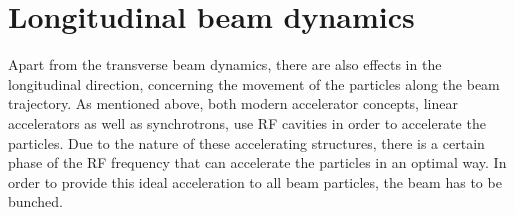 \section{Longitudinal beam dynamics}
\label{AccPhysics:Bunching}

Apart from the transverse beam dynamics, there are also effects in the longitudinal direction, concerning the movement of the particles along the beam trajectory.
As mentioned above, both modern accelerator concepts, linear accelerators as well as synchrotrons, use  RF cavities in order to accelerate the particles.
Due to the nature of these accelerating structures, there is a certain phase of the RF frequency that can accelerate the particles in an optimal way.
In order to provide this ideal acceleration to all beam particles, the beam has to be bunched.

